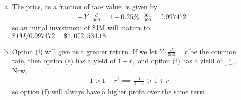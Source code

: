 \documentclass{article}
\begin{document}
\begin{enumerate}
\begin{enumerate}[(a)]
			\item
				\begin{soln}
					The price, as a fraction of face value, is given by
					\begin{align*}
						1-Y\cdot\frac{d}{360} = 1-0.25\%\cdot \frac{364}{360} = 0.997472
					\end{align*}
					so an initial investment of \$1M will mature to $\$1M/0.997472 = \$1, 002, 534.18.$
				\end{soln}

			\item 
				\begin{soln}
					Option (f) will give us a greater return. If we let $Y\cdot \frac{d}{360}=r$ be the common rate, then option (e) has a yield of $1+r,$ and option (f) has a yield of $\frac{1}{1-r}.$ Now,
					\begin{align*}
						1>1-r^2\implies \frac{1}{1-r} > 1+r
					\end{align*}
					so option (f) will always have a higher profit over the same term.
				\end{soln}
				
		\end{enumerate}
		
\end{enumerate}
\end{document}
